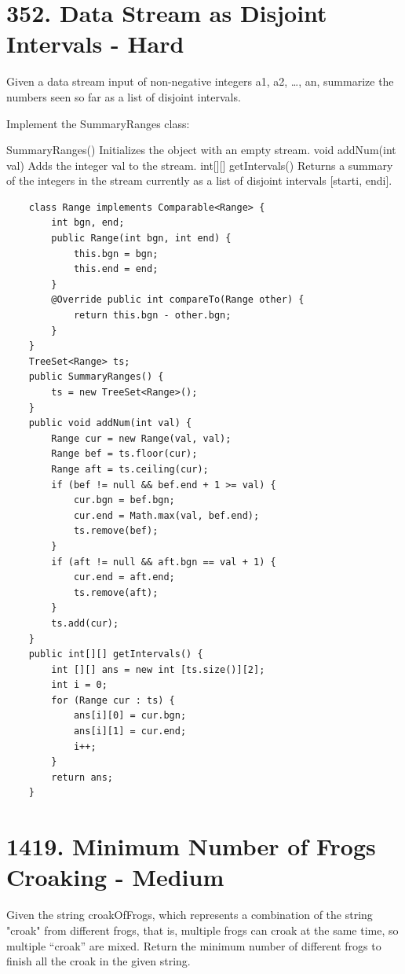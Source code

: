 \documentclass[9pt, b5paaper]{book}
\begin{document}
\section{352. Data Stream as Disjoint Intervals - Hard}
\label{sec-8-5}
Given a data stream input of non-negative integers a1, a2, \ldots{}, an, summarize the numbers seen so far as a list of disjoint intervals.

Implement the SummaryRanges class:

SummaryRanges() Initializes the object with an empty stream.
void addNum(int val) Adds the integer val to the stream.
int[][] getIntervals() Returns a summary of the integers in the stream currently as a list of disjoint intervals [starti, endi].
\begin{verbatim}
    class Range implements Comparable<Range> {
        int bgn, end;
        public Range(int bgn, int end) {
            this.bgn = bgn;
            this.end = end;
        }
        @Override public int compareTo(Range other) {
            return this.bgn - other.bgn;
        }
    }
    TreeSet<Range> ts; 
    public SummaryRanges() {
        ts = new TreeSet<Range>();
    }
    public void addNum(int val) {
        Range cur = new Range(val, val);
        Range bef = ts.floor(cur);
        Range aft = ts.ceiling(cur);
        if (bef != null && bef.end + 1 >= val) {
            cur.bgn = bef.bgn;
            cur.end = Math.max(val, bef.end);
            ts.remove(bef);
        }
        if (aft != null && aft.bgn == val + 1) {
            cur.end = aft.end;
            ts.remove(aft);
        }
        ts.add(cur);
    }
    public int[][] getIntervals() {
        int [][] ans = new int [ts.size()][2];
        int i = 0;
        for (Range cur : ts) {
            ans[i][0] = cur.bgn;
            ans[i][1] = cur.end;
            i++;
        }
        return ans;
    }
\end{verbatim}

\section{1419. Minimum Number of Frogs Croaking - Medium}
\label{sec-8-6}
Given the string croakOfFrogs, which represents a combination of the string "croak" from different frogs, that is, multiple frogs can croak at the same time, so multiple “croak” are mixed. Return the minimum number of different frogs to finish all the croak in the given string.
\end{document}
